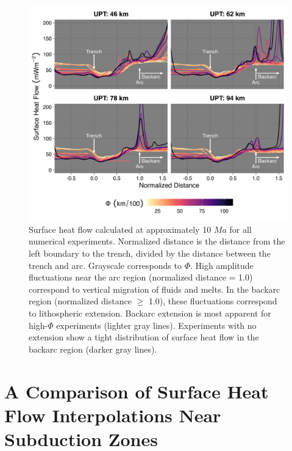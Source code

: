 \begin{figure}[htbp]

{\centering \includegraphics[width=1\linewidth,]{assets/figs/chpt2/figA7} 

}

\caption[Surface heat flow for all numerical experiments]{Surface heat flow calculated at approximately 10 $Ma$ for all numerical experiments. Normalized distance is the distance from the left boundary to the trench, divided by the distance between the trench and arc. Grayscale corresponds to $\Phi$. High amplitude fluctuations near the arc region (normalized distance = 1.0) correspond to vertical migration of fluids and melts. In the backarc region (normalized distance $\geq$ 1.0), these fluctuations correspond to lithospheric extension. Backarc extension is most apparent for high-$\Phi$ experiments (lighter gray lines). Experiments with no extension show a tight distribution of surface heat flow in the backarc region (darker gray lines).}\label{fig:hf}
\end{figure}

\cleardoublepage


\hypertarget{a-comparison-of-surface-heat-flow-interpolations-near-subduction-zones}{%
\chapter{A Comparison of Surface Heat Flow Interpolations Near Subduction Zones}\label{a-comparison-of-surface-heat-flow-interpolations-near-subduction-zones}}

